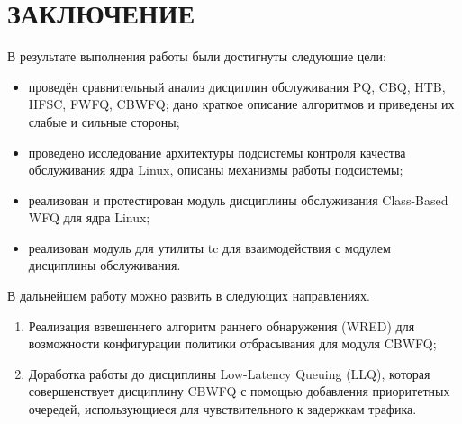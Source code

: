 \section*{ЗАКЛЮЧЕНИЕ}


	В результате выполнения работы были достигнуты следующие цели:
	\begin{itemize}
		\item проведён сравнительный анализ дисциплин обслуживания PQ, CBQ, HTB, HFSC, FWFQ, CBWFQ;
			  дано краткое описание алгоритмов и приведены их слабые и сильные стороны;
		\item проведено исследование архитектуры подсистемы контроля качества обслуживания ядра Linux,
			  описаны механизмы работы подсистемы;
		\item реализован и протестирован модуль дисциплины обслуживания Class-Based WFQ для ядра Linux;
		\item реализован модуль для утилиты tc для взаимодействия с модулем дисциплины обслуживания. 
	\end{itemize}

	В дальнейшем работу можно развить в следующих направлениях.
	\begin{enumerate}
		\item Реализация взвешеннего алгоритм раннего обнаружения (WRED) для возможности
			  конфигурации политики отбрасывания для модуля CBWFQ;
		\item Доработка работы до дисциплины Low-Latency Queuing (LLQ), которая
			  совершенствует дисциплину CBWFQ с помощью добавления приоритетных очередей,
			  использующиеся для чувствительного к задержкам трафика.

	\end{enumerate}
